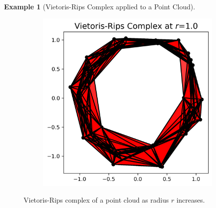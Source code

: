 \documentclass[ma]{uncgdissertationexp}
\theoremstyle{plain}
\theoremstyle{definition}
\newtheorem{example}[theorem]{Example}
\theoremstyle{remark}
\begin{document}
\begin{example}[Vietoris-Rips Complex applied to a Point Cloud]
\begin{figure}[H]
\begin{subfigure}[b]{0.22\textwidth}
    \end{subfigure}
        \hfill
    \begin{subfigure}[b]{0.22\textwidth}
        \centering
        \includegraphics[width=\textwidth]{point_cloud_plot_r1_0.png}
    \end{subfigure}
    \caption{Vietoris-Rips complex of a point cloud as radius $r$ increases.}
    \label{fig:point_cloud_radii}
\end{figure}
\end{example}
\end{document}
